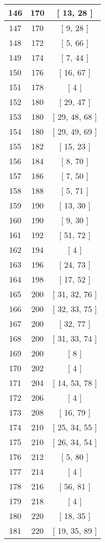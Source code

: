 \begin{center}
\begin{longtable}[H]{|| c c c ||}
\hline
146 & 170 & [ 13, 28 ] \\ 
\hline
147 & 170 & [ 9, 28 ] \\ 
\hline
148 & 172 & [ 5, 66 ] \\ 
\hline
149 & 174 & [ 7, 44 ] \\ 
\hline
150 & 176 & [ 16, 67 ] \\ 
\hline
151 & 178 & [ 4 ] \\ 
\hline
152 & 180 & [ 29, 47 ] \\ 
\hline
153 & 180 & [ 29, 48, 68 ] \\ 
\hline
154 & 180 & [ 29, 49, 69 ] \\ 
\hline
155 & 182 & [ 15, 23 ] \\ 
\hline
156 & 184 & [ 8, 70 ] \\ 
\hline
157 & 186 & [ 7, 50 ] \\ 
\hline
158 & 188 & [ 5, 71 ] \\ 
\hline
159 & 190 & [ 13, 30 ] \\ 
\hline
160 & 190 & [ 9, 30 ] \\ 
\hline
161 & 192 & [ 51, 72 ] \\ 
\hline
162 & 194 & [ 4 ] \\ 
\hline
163 & 196 & [ 24, 73 ] \\ 
\hline
164 & 198 & [ 17, 52 ] \\ 
\hline
165 & 200 & [ 31, 32, 76 ] \\ 
\hline
166 & 200 & [ 32, 33, 75 ] \\ 
\hline
167 & 200 & [ 32, 77 ] \\ 
\hline
168 & 200 & [ 31, 33, 74 ] \\ 
\hline
169 & 200 & [ 8 ] \\ 
\hline
170 & 202 & [ 4 ] \\ 
\hline
171 & 204 & [ 14, 53, 78 ] \\ 
\hline
172 & 206 & [ 4 ] \\ 
\hline
173 & 208 & [ 16, 79 ] \\ 
\hline
174 & 210 & [ 25, 34, 55 ] \\ 
\hline
175 & 210 & [ 26, 34, 54 ] \\ 
\hline
176 & 212 & [ 5, 80 ] \\ 
\hline
177 & 214 & [ 4 ] \\ 
\hline
178 & 216 & [ 56, 81 ] \\ 
\hline
179 & 218 & [ 4 ] \\ 
\hline
180 & 220 & [ 18, 35 ] \\ 
\hline
181 & 220 & [ 19, 35, 89 ] \\ 

\end{longtable}
\end{center}
